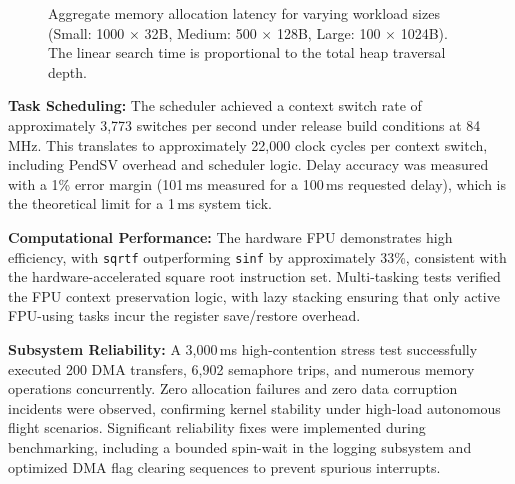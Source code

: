 \begin{figure}[H]
    \centering
    \caption{Aggregate memory allocation latency for varying workload sizes (Small: 1000 $\times$ 32B, Medium: 500 $\times$ 128B, Large: 100 $\times$ 1024B). The linear search time is proportional to the total heap traversal depth.}
    \label{fig:memory_benchmarks}
\end{figure}

\textbf{Task Scheduling:}  
The scheduler achieved a context switch rate of approximately 3,773 switches per second under release build conditions at 84\,MHz. This translates to approximately 22,000 clock cycles per context switch, including PendSV overhead and scheduler logic. Delay accuracy was measured with a 1\% error margin (101\,ms measured for a 100\,ms requested delay), which is the theoretical limit for a 1\,ms system tick.

\textbf{Computational Performance:}  
The hardware FPU demonstrates high efficiency, with \texttt{sqrtf} outperforming \texttt{sinf} by approximately 33\%, consistent with the hardware-accelerated square root instruction set. Multi-tasking tests verified the FPU context preservation logic, with lazy stacking ensuring that only active FPU-using tasks incur the register save/restore overhead.

\textbf{Subsystem Reliability:}  
A 3,000\,ms high-contention stress test successfully executed 200 DMA transfers, 6,902 semaphore trips, and numerous memory operations concurrently. Zero allocation failures and zero data corruption incidents were observed, confirming kernel stability under high-load autonomous flight scenarios. Significant reliability fixes were implemented during benchmarking, including a bounded spin-wait in the logging subsystem and optimized DMA flag clearing sequences to prevent spurious interrupts.